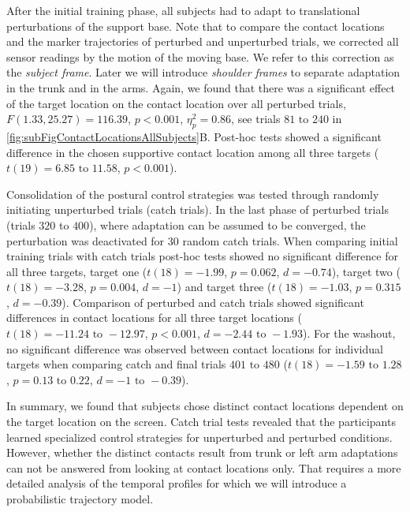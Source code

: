 After the initial training phase, all subjects had to adapt to translational 
perturbations of the support base. Note that to compare the contact locations and the 
marker trajectories of perturbed and unperturbed trials, we corrected all sensor 
readings by the motion of the moving base. We refer to this correction as the 
\textit{subject frame}. Later we will introduce \textit{shoulder frames} to 
separate adaptation in the trunk and in the arms. Again, we found that there was a 
 significant effect of the target location on the contact location over all perturbed 
 trials, $F(1.33,25.27) = 116.39$, $p < 0.001$, $\eta_p^2 = 0.86$, see trials 
 $81 \text{ to } 240$ in \FigureAbbr \ref{fig:subFigContactLocationsAllSubjects}B. Post-hoc 
tests showed a significant difference in the chosen supportive contact location 
 among all three targets ($t(19) = 6.85 \text{ to } 11.58$, $p < 0.001$).

Consolidation of the postural control strategies was tested through randomly 
initiating unperturbed trials (catch trials). In the last phase of perturbed 
trials (trials $320$ to $400$), where adaptation can be assumed to be converged, 
the perturbation was deactivated for $30$ random catch trials. When comparing initial training 
trials with catch trials post-hoc tests showed no significant difference for all 
three targets, target one ($t(18) = -1.99$, $p = 0.062$, $d = -0.74$), target two 
($t(18) = -3.28$, $p = 0.004$, $d = -1$) and target three ($t(18) = -1.03$, $p = 
0.315$, $d = -0.39$).
%
Comparison of perturbed and catch trials showed significant differences in 
contact locations for all three target locations ($t(18) = -11.24 \text{ to } -12.97$, $p < 
0.001$, $d = -2.44 \text{ to } -1.93$).
%
For the washout, no significant difference was observed between contact 
locations for individual targets when comparing catch and final trials $401 \text{ to } 480$ 
($t(18) = -1.59 \text{ to } 1.28$, $p = 0.13 \text{ to } 0.22$, $d = -1 \text{ to } -0.39$).



In summary, we found that subjects chose distinct contact locations dependent on the 
target location on the screen. Catch trial tests revealed that the participants 
learned specialized control strategies for unperturbed and perturbed conditions. 
However, whether the distinct contacts result from trunk or left arm adaptations 
can not be answered from looking at contact locations only. That 
requires a more detailed analysis of the temporal profiles for which we will 
introduce a probabilistic trajectory model. 

